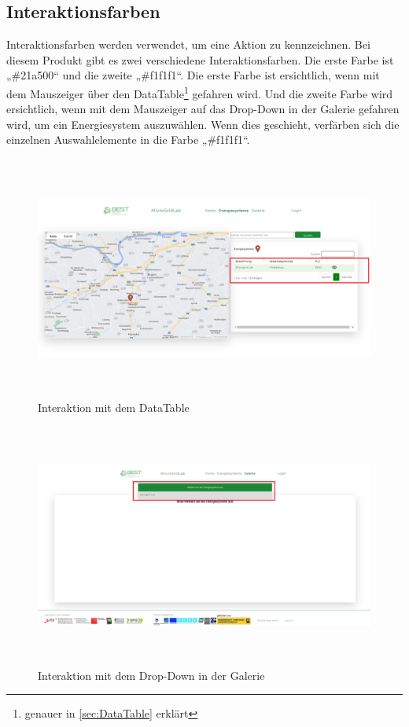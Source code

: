 \subsection{Interaktionsfarben}
Interaktionsfarben werden verwendet, um eine Aktion zu kennzeichnen. Bei diesem  Produkt gibt es zwei verschiedene Interaktionsfarben. Die erste Farbe ist „\#21a500“ und die zweite „\#f1f1f1“. Die erste Farbe ist ersichtlich, wenn mit dem Mauszeiger über den DataTable\footnote{genauer in \autoref{sec:DataTable} erklärt} gefahren wird. Und die zweite Farbe wird ersichtlich, wenn mit dem Mauszeiger auf das Drop-Down in der Galerie gefahren wird, um ein Energiesystem auszuwählen. Wenn dies geschieht, verfärben sich die einzelnen Auswahlelemente in die Farbe „\#f1f1f1“. 
\begin{figure}[h]
	\centering
	\includegraphics[height=8cm,width=15cm]{images/InteraktionDatatable}
	\caption{Interaktion mit dem DataTable}
	\label{fig: Interaktion mit dem Datatabel}
\end{figure}
\begin{figure}[h]
	\centering
	\includegraphics[height=8cm,width=15cm]{images/InteraktionDropDown}
	\caption{Interaktion mit dem Drop-Down in der Galerie}
	\label{fig: Interaktion mit dem Datatabel}
\end{figure}
\newpage

